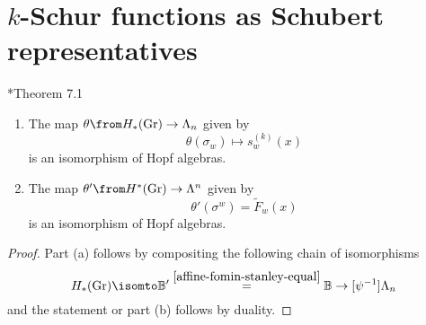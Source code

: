 \documentclass[11pt,leqno,oneside]{amsart}
\numberwithin{thm}{section}
\newcommand{\B}{\mathbb{B}}
\newcommand{\Gr}{\operatorname{Gr}}
\newcommand{\sym}{\Lambda}
\begin{document}
\section{\(k\)-Schur functions as Schubert representatives}\label{schubert-representatives}
\begin{thm}{\cite{lam}*{Theorem 7.1}}\label{k-schur-functions-are-schubert-reps}
  \begin{enumerate}
  \item The map \(\theta \from H_*(\Gr) \to \sym_n\) given by
    \[
      \theta(\sigma_w) \mapsto s_w^{(k)}(x)
    \]
    is an isomorphism of Hopf algebras.
  \item The map
    \(\theta' \from H^*(\Gr) \to \sym^n\) given by
    \[
      \theta'(\sigma^w) = \tilde{F}_w(x)
    \]
    is an isomorphism of Hopf algebras.
  \end{enumerate}
\end{thm}
\begin{proof}
  Part (a) follows by compositing the following chain of isomorphisms \[
    H_*(\Gr) \isomto \B' \overset{\ref{affine-fomin-stanley-equal}}{=}
    \B \to[\psi^{-1}] \sym_n 
  \]
  and the statement or part (b) follows by duality.
\end{proof}
\end{document}
